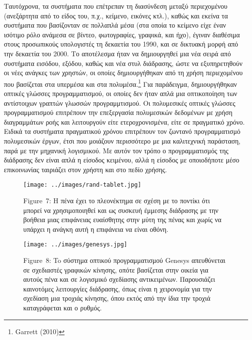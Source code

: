 \documentclass[
]{article}
\begin{document}
Ταυτόχρονα, τα συστήματα που επέτρεπαν τη διασύνδεση μεταξύ περιεχομένου
(ανεξάρτητα από το είδος του, π.χ., κείμενο, εικόνες κτλ.), καθώς και
εκείνα τα συστήματα που βασίζονταν σε πολλαπλά μέσα (στα οποία το
κείμενο είχε έναν ισότιμο ρόλο ανάμεσα σε βίντεο, φωτογραφίες, γραφικά,
και ήχο), έγιναν διαθέσιμα στους προσωπικούς υπολογιστές τη δεκαετία του
1990, και σε δικτυακή μορφή από την δεκαετία του 2000. Το αποτέλεσμα
ήταν να δημιουργηθεί μια νέα σειρά από συστήματα εισόδου, εξόδου, καθώς
και νέα στυλ διάδρασης, ώστε να εξυπηρετηθούν οι νέες ανάγκες των
χρηστών, οι οποίες δημιουργήθηκαν από τη χρήση περιεχομένου που
βασίζεται στα υπερμέσα και στα πολυμέσα.\footnote{Garrett (2010)} Για
παράδειγμα, δημιουργήθηκαν οπτικές γλώσσες προγραμματισμού, οι οποίες
δεν ήταν απλά μια οπτικοποίηση των αντίστοιχων γραπτών γλωσσών
προγραμμτισμού. Οι πολυμεσικές οπτικές γλώσσες προγραμματισμού
επιτρέπουν την επεξεργασία πολυμεσικών δεδομένων με χρήση διαγραμμάτων
ροής και λειτουργούν είτε ετεροχρονισμένα, είτε σε πραγματικό χρόνο.
Ειδικά τα συστήματα πραγματικού χρόνου επιτρέπουν τον ζωντανό
προγραμματισμό πολυμεσικών έργων, έτσι που μοιάζουν περισσότερο με μια
καλιτεχνική παράσταση, παρά με την μηχανική λογισμικού. Με αυτόν τον
τρόπο ο προγραμματισμός της διάδρασης δεν είναι απλά η είσοδος κειμένου,
αλλά η είσοδος με οποιοδήποτε μέσο επικοινωνίας ταιριάζει στον χρήστη
και στο πεδίο χρήσης.

\leavevmode{}%
\begin{figure}
\hypertarget{fig:rand-tablet}{%
\centering
\texttt{[image: ../images/rand-tablet.jpg]}
\caption{Figure~7: Η πένα έχει το πλεονέκτημα σε σχέση με το ποντίκι ότι
μπορεί να χρησιμοποιηθεί και ως συσκευή έμμεσης διάδρασης με την βοήθεια
μιας επιφάνειας ευαίσθητης στην μύτη της πένας και χωρίς να υπάρχει η
ανάγκη αυτή η επιφάνεια να είναι οθόνη.}\label{fig:rand-tablet}
}
\end{figure}

\leavevmode{}%
\begin{figure}
\hypertarget{fig:genesys}{%
\centering
\texttt{[image: ../images/genesys.jpg]}
\caption{Figure~8: To σύστημα οπτικού προγραμματισμού Genesys
απευθύνεται σε σχεδιαστές γραφικών κίνησης, οπότε βασίζεται στην οικεία
για αυτούς πένα και σε λογισμικό σχεδίασης αντικειμένων. Παρουσιάζει
καινοτόμες λειτουργίες διάδρασης, όπως είναι η χειρονομία για την
σχεδίαση μια τροχιάς κίνησης, όπου εκτός από την ίδια την τροχιά
καταγράφεται και ο ρυθμός.}\label{fig:genesys}
}
\end{figure}
\end{document}
